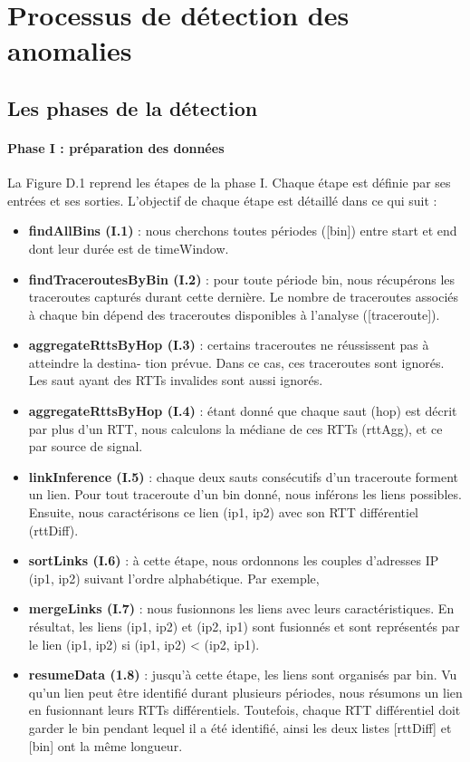  
 \section{Processus de détection des anomalies}
 \subsection{Les phases de la détection }
 \paragraph{Phase I : préparation des données}
 La Figure D.1 reprend les étapes de la phase I. Chaque étape est définie par ses entrées et
 ses sorties. L’objectif de chaque étape est détaillé dans ce qui suit :
 \begin{itemize}
 	\item \textbf{findAllBins (I.1)} : nous cherchons toutes périodes {\color{gray}([bin])} entre start et end dont leur
 durée est de timeWindow.
 \item \textbf{findTraceroutesByBin (I.2)} : pour toute période  {\color{gray}bin}, nous récupérons les traceroutes
 capturés durant cette dernière. Le nombre de traceroutes associés à chaque bin dépend
 des traceroutes disponibles à l’analyse  {\color{gray}([traceroute])}.
 \item \textbf{aggregateRttsByHop (I.3)} : certains traceroutes ne réussissent pas à atteindre la destina-
 tion prévue. Dans ce cas, ces traceroutes sont ignorés. Les saut ayant des RTTs invalides
 sont aussi ignorés.
 \item \textbf{aggregateRttsByHop (I.4)} : étant donné que chaque saut  {\color{gray}(hop)} est décrit par plus d’un
 RTT, nous calculons la médiane de ces RTTs  {\color{gray}(rttAgg)}, et ce par source de signal.
 \item \textbf{linkInference (I.5)} : chaque deux sauts consécutifs d’un traceroute forment un lien. Pour
 tout traceroute d’un bin donné, nous inférons les liens possibles. Ensuite, nous caractérisons ce lien  {\color{gray}(ip1, ip2)} avec son RTT différentiel  {\color{gray}(rttDiff)}.
\item \textbf{sortLinks (I.6) }: à cette étape, nous ordonnons les couples d'adresses IP  {\color{gray}(ip1, ip2)} suivant l'ordre alphabétique. Par exemple, 
 
 \item \textbf{mergeLinks (I.7)} : nous fusionnons les liens avec leurs caractéristiques. En résultat, les
 liens (ip1, ip2) et (ip2, ip1) sont fusionnés et sont représentés par le lien (ip1, ip2) si (ip1,
 ip2) < (ip2, ip1).
 \item \textbf{resumeData (1.8)} : jusqu’à cette étape, les liens sont organisés par bin. Vu qu’un lien
 peut être identifié durant plusieurs périodes, nous résumons un lien en fusionnant leurs
 RTTs différentiels. Toutefois, chaque RTT différentiel doit garder le bin pendant lequel il
 a été identifié, ainsi les deux listes  {\color{gray}[rttDiff]} et  {\color{gray}[bin]} ont la même longueur.
 
 
\end{itemize}


